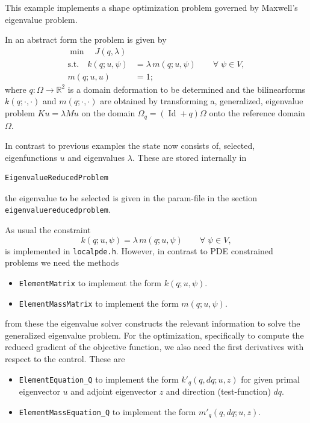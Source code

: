 This example implements a shape optimization problem governed by Maxwell's eigenvalue problem.

In an abstract form the problem is given by 
\begin{equation*}
	\begin{aligned}
		\min\quad J(q,\lambda)\\
		\text{s.t.} \quad k(q;u,\psi) &= \lambda \, m(q;u,\psi) \qquad \forall \; \psi \in V,\\
		m(q;u,u) &= 1;	
	\end{aligned}	
\end{equation*}
where $q\colon \Omega \rightarrow \mathbb{R}^2$ is a domain deformation to be determined and the bilinearforms $k(q;\cdot,\cdot)$ and $m(q;\cdot,\cdot)$
are obtained by transforming a, generalized, eigenvalue problem $Ku=\lambda Mu$ on the domain $\Omega_q = (\operatorname{Id}+q)\Omega$
onto the reference domain $\Omega$.

In contrast to previous examples the state now consists of, selected, eigenfunctions $u$ and eigenvalues $\lambda$. These are stored internally in
\begin{verbatim}
EigenvalueReducedProblem
\end{verbatim}
the eigenvalue to be selected is given in the param-file in the section \texttt{eigenvaluereducedproblem}.

As usual the constraint
\[
k(q;u,\psi) = \lambda \, m(q;u,\psi) \qquad \forall \; \psi \in V,
\]
is implemented in \texttt{localpde.h}. However, in contrast to PDE constrained problems we need the
methods
\begin{itemize}
\item \texttt{ElementMatrix} to implement the form $k(q;u,\psi)$.
\item \texttt{ElementMassMatrix} to implement the form $m(q;u,\psi)$. 
\end{itemize}
from these the eigenvalue solver constructs the relevant information to solve the generalized eigenvalue problem.
For the optimization, specifically to compute the reduced gradient of the objective function, we also need the first derivatives
with respect to the control. These are
\begin{itemize}
\item \texttt{ElementEquation\_Q} to implement the form $k'_q(q,dq;u,z)$ for given primal eigenvector $u$ and adjoint eigenvector $z$ and direction (test-function) $dq$.
\item \texttt{ElementMassEquation\_Q} to implement the form $m'_q(q,dq;u,z)$. 
\end{itemize}

